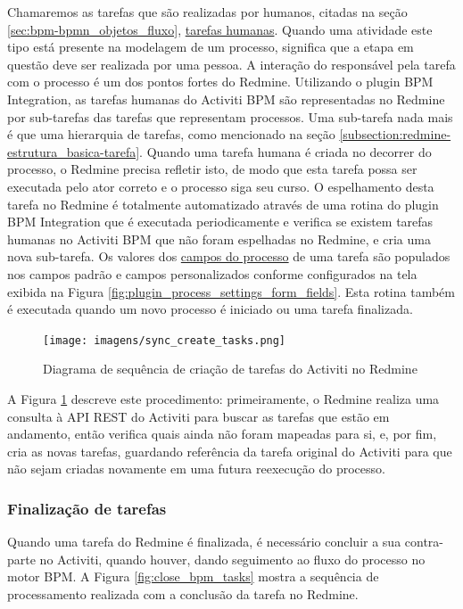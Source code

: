 Chamaremos as tarefas que são realizadas por humanos, citadas na seção \ref{sec:bpm-bpmn_objetos_fluxo}, \underline{tarefas humanas}. Quando uma atividade este tipo está presente na modelagem de um processo, significa que a etapa em questão deve ser realizada por uma pessoa. A interação do responsável pela tarefa com o processo é um dos pontos fortes do Redmine. Utilizando o plugin BPM Integration, as tarefas humanas do Activiti BPM são representadas no Redmine por sub-tarefas das tarefas que representam processos. Uma sub-tarefa nada mais é que uma hierarquia de tarefas, como mencionado na seção \ref{subsection:redmine-estrutura_basica-tarefa}.
Quando uma tarefa humana é criada no decorrer do processo, o Redmine precisa refletir isto, de modo que esta tarefa possa ser executada pelo ator correto e o processo siga seu curso. O espelhamento desta tarefa no Redmine é totalmente automatizado através de uma rotina do plugin BPM Integration que é executada periodicamente e verifica se existem tarefas humanas no Activiti BPM que não foram espelhadas no Redmine, e cria uma nova sub-tarefa. Os valores dos \underline{campos do processo} de uma tarefa são populados nos campos padrão e campos personalizados conforme configurados na tela exibida na Figura \ref{fig:plugin_process_settings_form_fields}. Esta rotina também é executada quando um novo processo é iniciado ou uma tarefa finalizada.

\begin{figure}[H]
\centering
\texttt{[image: imagens/sync\_create\_tasks.png]}
\caption{Diagrama de sequência de criação de tarefas do Activiti no Redmine}
\label{fig:sync_bpm_tasks}
\end{figure}

A Figura \ref{fig:sync_bpm_tasks} descreve este procedimento: primeiramente, o Redmine realiza uma consulta à API REST do Activiti para buscar as tarefas que estão em andamento, então verifica quais ainda não foram mapeadas para si, e, por fim, cria as novas tarefas, guardando referência da tarefa original do Activiti para que não sejam criadas novamente em uma futura reexecução do processo.

\subsubsection{Finalização de tarefas}\label{sec:integracao_redmine_activiti_sincronizacao-finalizacao_human_task}

Quando uma tarefa do Redmine é finalizada, é necessário concluir a sua contra-parte no Activiti, quando houver, dando seguimento ao fluxo do processo no motor BPM. A Figura \ref{fig:close_bpm_tasks} mostra a sequência de processamento realizada com a conclusão da tarefa no Redmine.


